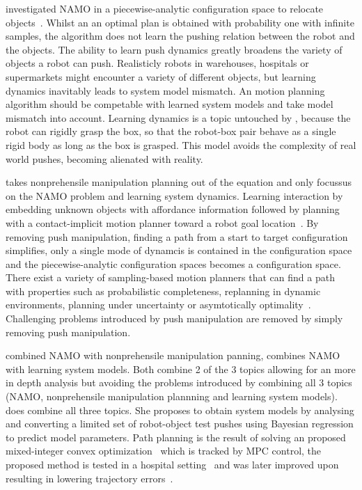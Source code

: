 \citeauthor{vega-brown_asymptotically_2020} investigated \ac{NAMO} in a piecewise-analytic configuration space to relocate objects~\cite{vega-brown_asymptotically_2020}. Whilst an an optimal plan is obtained with probability one with infinite samples, the algorithm does not learn the pushing relation between the robot and the objects. The ability to learn push dynamics greatly broadens the variety of objects a robot can push. Realisticly robots in warehouses, hospitals or supermarkets might encounter a variety of different objects, but learning dynamics inavitably leads to system model mismatch. An motion planning algorithm should be competable with learned system models and take model mismatch into account. Learning dynamics is a topic untouched by \citeauthor{vega-brown_asymptotically_2020}, because the robot can rigidly grasp the box, so that the robot-box pair behave as a single rigid body as long as the box is grasped. This model avoids the complexity of real world pushes, becoming alienated with reality.\bs

\citeauthor{wang_affordancebased_2020} takes nonprehensile manipulation planning out of the equation and only focussus on the \ac{NAMO} problem and learning system dynamics. Learning interaction by embedding unknown objects with affordance information followed by planning with a contact-implicit motion planner toward a robot goal location~\cite{wang_affordancebased_2020}. By removing push manipulation, finding a path from a start to target configuration simplifies, only a single mode of dynamcis is contained in the configuration space and the piecewise-analytic configuration spaces becomes a configuration space. There exist a variety of sampling-based motion planners that can find a path with properties such as probabilistic completeness, replanning in dynamic environments, planning under uncertainty or asymtotically optimality~\cite{karaman_samplingbased_2011,elbanhawi_samplingbased_2014}. Challenging problems introduced by push manipulation are removed by simply removing push manipulation.\bs

\citeauthor{vega-brown_asymptotically_2020} combined \ac{NAMO} with nonprehensile manipulation panning, \citeauthor{wang_affordancebased_2020} combines \ac{NAMO} with learning system models. Both combine 2 of the 3 topics allowing for an more in depth analysis but avoiding the problems introduced by combining all 3 topics (\ac{NAMO}, nonprehensile manipulation plannning and learning system models). \citeauthor{sabbaghnovin_model_2021} does combine all three topics. She proposes to obtain system models by analysing and converting a limited set of robot-object test pushes using Bayesian regression to predict model parameters. Path planning is the result of solving an proposed mixed-integer convex optimization~\cite{sabbaghnovin_optimal_2016} which is tracked by \ac{MPC} control, the proposed method is tested in a hospital setting~\cite{novin_dynamic_2018} and was later improved upon resulting in lowering trajectory errors~\cite{sabbaghnovin_model_2021}.\bs

